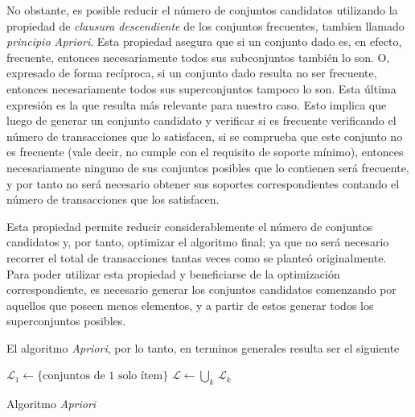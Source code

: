 No obstante, es posible reducir el número de conjuntos candidatos utilizando la propiedad de \textit{clausura descendiente} de los conjuntos frecuentes, tambien llamado \textit{principio Apriori}. Esta propiedad asegura que si un conjunto dado es, en efecto, frecuente, entonces necesariamente todos sus subconjuntos también lo son. O, expresado de forma recíproca, si un conjunto dado resulta no ser frecuente, entonces necesariamente todos sus superconjuntos tampoco lo son. Esta última expresión es la que resulta más relevante para nuestro caso. Esto implica que luego de generar un conjunto candidato y verificar si es frecuente verificando el número de transacciones que lo satisfacen, si se comprueba que este conjunto no es frecuente (vale decir, no cumple con el requisito de soporte mínimo), entonces necesariamente ninguno de sus conjuntos posibles que lo contienen será frecuente, y por tanto no será necesario obtener sus soportes correspondientes contando el número de transacciones que los satisfacen.


Esta propiedad permite reducir considerablemente el número de conjuntos candidatos y, por tanto, optimizar el algoritmo final; ya que no será necesario recorrer el total de transacciones tantas veces como se planteó originalmente. Para poder utilizar esta propiedad y beneficiarse de la optimización correspondiente, es necesario generar los conjuntos candidatos comenzando por aquellos que poseen menos elementos, y a partir de estos generar todos los superconjuntos posibles.

El algoritmo \textit{Apriori}, por lo tanto, en terminos generales resulta ser el siguiente

\begin{algorithm}[H]
\DontPrintSemicolon
{}
$\mathcal{L}_1 \leftarrow \{\text{conjuntos de 1 solo ítem}\}$\;
$\mathcal{L} \leftarrow \bigcup_k \, \mathcal{L}_k$\;
\caption{Algoritmo \textit{Apriori}}
\end{algorithm}

